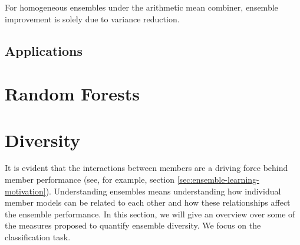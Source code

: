 \documentclass[
    a4paper, %
	fontsize=10pt, %
	twoside=false, %
]{kaobook}
\begin{document}
\begin{corollary}
For homogeneous ensembles under the arithmetic mean combiner, ensemble improvement is solely due to variance reduction.
\end{corollary}


\section{Applications}



\chapter{Random Forests}


\chapter{Diversity}







It is evident that the interactions between members are a driving force behind member performance (see, for example, section \ref{sec:ensemble-learning-motivation}). Understanding ensembles means understanding how individual member models can be related to each other and how these relationships affect the ensemble performance. In this section, we will give an overview over some of the measures proposed to quantify ensemble diversity. We focus on the classification task. 
\end{document}
